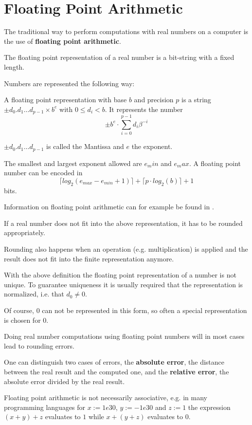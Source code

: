 \section{Floating Point Arithmetic}
The traditional way to perform computations with real numbers on a computer is the use 
of \textbf{floating point arithmetic}. 

The floating point representation of a real number is a bit-string with a fixed
length.

Numbers are represented the following way:
\begin{definition}\label{def: floating point number}
	A floating point representation with base $b$ and precision $p$
	is a string $\pm d_0 . d_1 \dots d_{p-1} \times b^e$ with $0 \leq d_i < b$.	
	It represents the number
	$$ \pm b^e \cdot \sum_{i=0}^{p-1} d_i\beta^{-i} $$ 

	$\pm d_0 . d_1 \dots d_{p-1}$ is called the Mantissa and $e$ the exponent.
	
	The smallest and largest exponent allowed are $e_min$ and $e_max$.
	A floating point number can be encoded in
	$$ \lceil log_2(e_{max}-e_{min}+1) \rceil + \lceil  p \cdot log_2 (b) \rceil + 1 $$
	bits.
\end{definition}

Information on floating point arithmetic can for example be found in
\cite{Goldberg1991}.

If a real number does not fit into the above representation, it has to be
rounded appropriately.

Rounding also happens when an operation (e.g. multiplication) is applied and
the result does not fit into the finite representation anymore.

With the above definition the floating point representation of a number is not
unique. 
To guarantee uniqueness it is usually required that the representation  is
normalized, i.e. that $d_0 \neq 0$. 

Of course, $0$ can not be represented in this form, so often a special
representation is chosen for $0$.

Doing real number computations using floating point numbers will in most cases
lead to rounding errors.

One can distinguish two cases of errors, the \textbf{absolute error}, the
distance between the real result and the computed one, and the \textbf{relative
error}, the absolute error divided by the real result.

Floating point arithmetic is not necessarily associative, e.g. in many
programming languages for $x := 1e30$, $y := -1e30$ and $z := 1$ the expression
$(x+y)+z$ evaluates to $1$ while $x+(y+z)$ evaluates to $0$.

